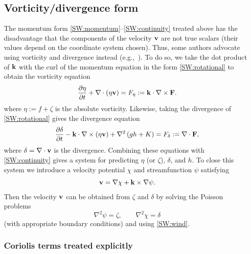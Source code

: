 \documentclass[12pt]{article}
\newcommand{\cross}{\times}
\newcommand{\del}{\nabla}
\begin{document}
\pagebreak[3]
\subsection{Vorticity/divergence form}

The momentum form \eqref{SW:momentum}--\eqref{SW:continuity} treated above has
the disadvantage that the components of the velocity $\mathbf{v}$ are not true
scalars (their values depend on the coordinate system chosen).  Thus, some
authors advocate using vorticity and divergence instead
(e.g.,~\cite{Heikes_Randall95a}).  To do so, we take the dot product of
$\mathbf{k}$ with the curl of the momentum equation in the form
\eqref{SW:rotational} to obtain the vorticity equation 
\begin{equation}
   \frac{\partial \eta}{\partial t} + \del\cdot(\eta\vecv) =
      \Feta := \veck\cdot\del\cross\Fmom .
\label{SW:vorticity}
\end{equation}
where $\eta:=f+\zeta$ is the absolute vorticity.  Likewise, taking the
divergence of \eqref{SW:rotational} gives the divergence equation
\begin{equation}
   \frac{\partial \delta}{\partial t} - \veck\cdot\del\cross(\eta\vecv) 
      + \del^2 \left(gh + K\right) = \Fdelta := \del\cdot\Fmom ,
\label{SW:divergence}
\end{equation}
where $\delta = \del\cdot\vecv$ is the divergence.  Combining these equations
with \eqref{SW:continuity} gives a system for predicting $\eta$ (or $\zeta$),
$\delta$, and $h$.  To close this system we introduce a velocity potential
$\chi$ and streamfunction $\psi$ satisfying 
\begin{equation}
   \vecv = \del\chi + \veck\cross\del\psi .
\label{SW:wind}
\end{equation}
Then the velocity $\mathbf{v}$ can be obtained from $\zeta$ and $\delta$ by solving
the Poisson problems
\begin{equation}
   \del^2\psi = \zeta, \qquad \del^2\chi = \delta 
\label{SW:Poisson}
\end{equation}
(with appropriate boundary conditions) and using \eqref{SW:wind}.  

\pagebreak[2]
\subsubsection{Coriolis terms treated explicitly}
\end{document}
